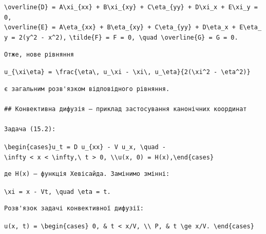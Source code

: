 \documentclass[
  ukrainian,
]{article}
\begin{document}
\texttt{\textbackslash{}overline\{D\}\ =\ A\textbackslash{}xi\_\{xx\}\ +\ B\textbackslash{}xi\_\{xy\}\ +\ C\textbackslash{}eta\_\{yy\}\ +\ D\textbackslash{}xi\_x\ +\ E\textbackslash{}xi\_y\ =\ 0,}
\texttt{\textbackslash{}overline\{E\}\ =\ A\textbackslash{}eta\_\{xx\}\ +\ B\textbackslash{}eta\_\{xy\}\ +\ C\textbackslash{}eta\_\{yy\}\ +\ D\textbackslash{}eta\_x\ +\ E\textbackslash{}eta\_y\ =\ 2(y\^{}2\ -\ x\^{}2),}
\texttt{\textbackslash{}tilde\{F\}\ =\ F\ =\ 0,\ \textbackslash{}quad\ \textbackslash{}overline\{G\}\ =\ G\ =\ 0.}

\begin{verbatim}
Отже, нове рівняння
\end{verbatim}

\texttt{u\_\{\textbackslash{}xi\textbackslash{}eta\}\ =\ \textbackslash{}frac\{\textbackslash{}eta\textbackslash{},\ u\_\textbackslash{}xi\ -\ \textbackslash{}xi\textbackslash{},\ u\_\textbackslash{}eta\}\{2(\textbackslash{}xi\^{}2\ -\ \textbackslash{}eta\^{}2)\}}

\begin{verbatim}
є загальним розв'язком відповідного рівняння.

## Конвективна дифузія — приклад застосування канонічних координат

Задача (15.2):
\end{verbatim}

\texttt{\textbackslash{}begin\{cases\}u\_t\ =\ D\ u\_\{xx\}\ -\ V\ u\_x,\ \textbackslash{}quad\ -\textbackslash{}infty\ \textless{}\ x\ \textless{}\ \textbackslash{}infty,\textbackslash{}\ t\ \textgreater{}\ 0,\ \textbackslash{}\textbackslash{}u(x,\ 0)\ =\ H(x),\textbackslash{}end\{cases\}}

\begin{verbatim}
де H(x) — функція Хевісайда. Замінимо змінні:
\end{verbatim}

\texttt{\textbackslash{}xi\ =\ x\ -\ Vt,\ \textbackslash{}quad\ \textbackslash{}eta\ =\ t.}

\begin{verbatim}
Розв'язок задачі конвективної дифузії:
\end{verbatim}

\texttt{u(x,\ t)\ =\ \textbackslash{}begin\{cases\}\ 0,\ \&\ t\ \textless{}\ x/V,\ \textbackslash{}\textbackslash{}\ P,\ \&\ t\ \textbackslash{}ge\ x/V.\ \textbackslash{}end\{cases\}}
\end{document}
